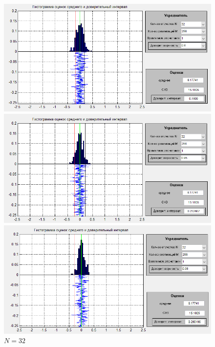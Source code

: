  \begin{figure}[H]
	\begin{minipage}{0.3\linewidth}
		\centering
        \includegraphics[width=\linewidth]{fig/realize_b1N3}
		\caption*{$\beta =0.8$}
	\end{minipage}
	\begin{minipage}{0.3\linewidth}
		\centering
        \includegraphics[width=\linewidth]{fig/realize_b2N3.png}
		\caption*{$\beta =0.95$}
	\end{minipage}
	\begin{minipage}{0.3\linewidth}
		\centering
        \includegraphics[width=\linewidth]{fig/realize_b3N3}
		\caption*{$\beta =0.98$}
	\end{minipage}
	\caption*{$N=32$}
\end{figure}
